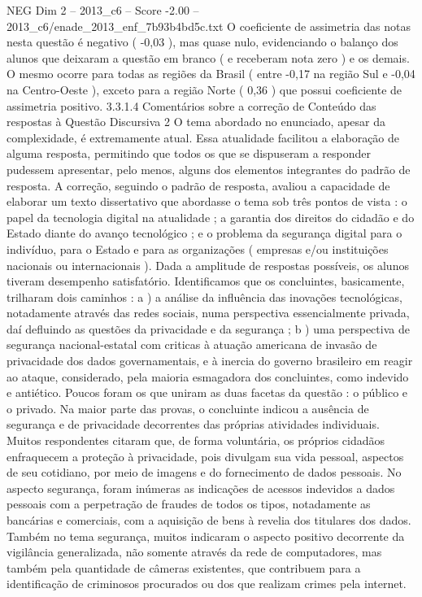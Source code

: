 \begin{textsample}{NEG Dim 2 – 2013\_c6 – Score -2.00 – 2013\_c6/enade\_2013\_enf\_7b93b4bd5c.txt}
O coeficiente de assimetria das notas nesta questão é negativo ( -0,03 ), mas quase nulo, evidenciando o balanço dos alunos que deixaram a questão em branco ( e receberam nota zero ) e os demais.
O mesmo ocorre para todas as regiões da Brasil ( entre -0,17 na região Sul e -0,04 na Centro-Oeste ), exceto para a região Norte ( 0,36 ) que possui coeficiente de assimetria positivo. 3.3.1.4 Comentários sobre a correção de Conteúdo das respostas à Questão Discursiva 2 O tema abordado no enunciado, apesar da complexidade, é extremamente atual.
Essa atualidade facilitou a elaboração de alguma resposta, permitindo que todos os que se dispuseram a responder pudessem apresentar, pelo menos, alguns dos elementos integrantes do padrão de resposta.
A correção, seguindo o padrão de resposta, avaliou a capacidade de elaborar um texto dissertativo que abordasse o tema sob três pontos de vista : o papel da tecnologia digital na atualidade ; a garantia dos direitos do cidadão e do Estado diante do avanço tecnológico ; e o problema da segurança digital para o indivíduo, para o Estado e para as organizações ( empresas e/ou instituições nacionais ou internacionais ).
Dada a amplitude de respostas possíveis, os alunos tiveram desempenho satisfatório.
Identificamos que os concluintes, basicamente, trilharam dois caminhos : a ) a análise da influência das inovações tecnológicas, notadamente através das redes sociais, numa perspectiva essencialmente privada, daí defluindo as questões da privacidade e da segurança ; b ) uma perspectiva de segurança nacional-estatal com criticas à atuação americana de invasão de privacidade dos dados governamentais, e à inercia do governo brasileiro em reagir ao ataque, considerado, pela maioria esmagadora dos concluintes, como indevido e antiético.
Poucos foram os que uniram as duas facetas da questão : o público e o privado.
Na maior parte das provas, o concluinte indicou a ausência de segurança e de privacidade decorrentes das próprias atividades individuais.
Muitos respondentes citaram que, de forma voluntária, os próprios cidadãos enfraquecem a proteção à privacidade, pois divulgam sua vida pessoal, aspectos de seu cotidiano, por meio de imagens e do fornecimento de dados pessoais.
No aspecto segurança, foram inúmeras as indicações de acessos indevidos a dados pessoais com a perpetração de fraudes de todos os tipos, notadamente as bancárias e comerciais, com a aquisição de bens à revelia dos titulares dos dados.
Também no tema segurança, muitos indicaram o aspecto positivo decorrente da vigilância generalizada, não somente através da rede de computadores, mas também pela quantidade de câmeras existentes, que contribuem para a identificação de criminosos procurados ou dos que realizam crimes pela internet.

\end{textsample}
